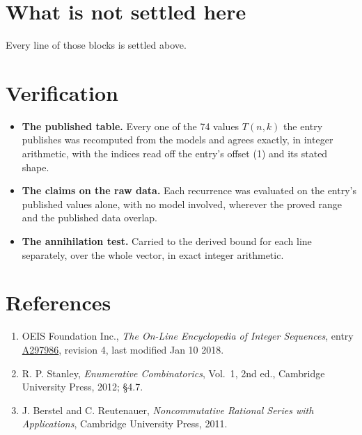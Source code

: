 \documentclass[11pt]{article}
\theoremstyle{definition}
\begin{document}
\section{What is not settled here}

Every line of those blocks is settled above.

\section{Verification}

\begin{itemize}

\item {\bfseries The published table.} Every one of the 74 values $T(n,k)$ the entry publishes was recomputed from the models and agrees exactly, in integer arithmetic, with the indices read off the entry's offset (1) and its stated shape.

\item {\bfseries The claims on the raw data.} Each recurrence was evaluated on the entry's published values alone, with no model involved, wherever the proved range and the published data overlap.

\item {\bfseries The annihilation test.} Carried to the derived bound for each line separately, over the whole vector, in exact integer arithmetic.

\end{itemize}

\section{References}

\begin{enumerate}

\item OEIS Foundation Inc., \emph{The On-Line Encyclopedia of Integer Sequences}, entry \href{https://oeis.org/A297986}{A297986}, revision 4, last modified Jan 10 2018.

\item R. P. Stanley, \emph{Enumerative Combinatorics}, Vol.~1, 2nd ed., Cambridge University Press, 2012; \S4.7.

\item J. Berstel and C. Reutenauer, \emph{Noncommutative Rational Series with Applications}, Cambridge University Press, 2011.

\end{enumerate}
\end{document}
